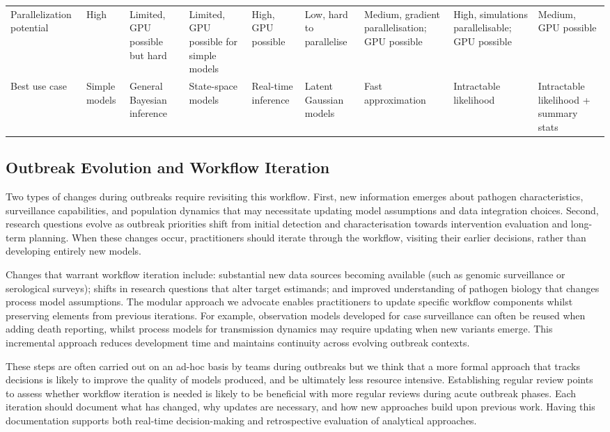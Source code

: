 \documentclass{article}
\begin{document}
\begin{landscape}
\begin{table}[ht]
\begin{tabular}{@{}p{3.2cm}p{1.5cm}p{1.5cm}p{1.5cm}p{1.5cm}p{1.5cm}p{1.5cm}p{1.5cm}p{1.5cm}@{}}
Parallelization potential & 
High & 
Limited, GPU possible but hard & 
Limited, GPU possible for simple models & 
High, GPU possible & 
Low, hard to parallelise & 
Medium, gradient parallelisation; GPU possible & 
High, simulations parallelisable; GPU possible & 
Medium, GPU possible \\
Best use case & Simple models & General Bayesian inference & State-space models & Real-time inference & Latent Gaussian models & Fast approximation & Intractable likelihood & Intractable likelihood + summary stats \\
\bottomrule
\end{tabular}
\end{table}
\end{landscape}

\subsection{Outbreak Evolution and Workflow Iteration}

Two types of changes during outbreaks require revisiting this workflow.
First, new information emerges about pathogen characteristics, surveillance capabilities, and population dynamics that may necessitate updating model assumptions and data integration choices.
Second, research questions evolve as outbreak priorities shift from initial detection and characterisation towards intervention evaluation and long-term planning.
When these changes occur, practitioners should iterate through the workflow, visiting their earlier decisions, rather than developing entirely new models.

Changes that warrant workflow iteration include: substantial new data sources becoming available (such as genomic surveillance or serological surveys); shifts in research questions that alter target estimands; and improved understanding of pathogen biology that changes process model assumptions.
The modular approach we advocate enables practitioners to update specific workflow components whilst preserving elements from previous iterations.
For example, observation models developed for case surveillance can often be reused when adding death reporting, whilst process models for transmission dynamics may require updating when new variants emerge.
This incremental approach reduces development time and maintains continuity across evolving outbreak contexts.

These steps are often carried out on an ad-hoc basis by teams during outbreaks but we think that a more formal approach that tracks decisions is likely to improve the quality of models produced, and be ultimately less resource intensive.
Establishing regular review points to assess whether workflow iteration is needed is likely to be beneficial with more regular reviews during acute outbreak phases.
Each iteration should document what has changed, why updates are necessary, and how new approaches build upon previous work.
Having this documentation supports both real-time decision-making and retrospective evaluation of analytical approaches.
\end{document}
